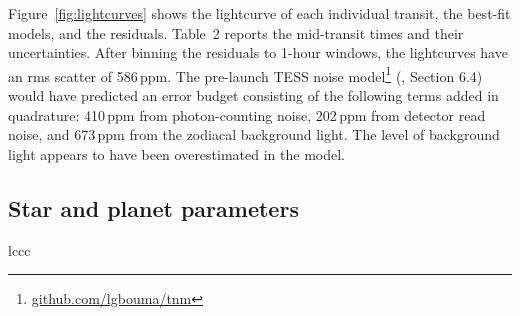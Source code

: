\documentclass[12pt,twocolumn,tighten]{aastex62}
\begin{document}
{Figure~\ref{fig:lightcurves} shows the lightcurve of each individual
transit, the best-fit models, and the residuals.  Table~2 reports the
mid-transit times and their uncertainties.  After binning the
residuals to 1-hour windows, the lightcurves have an rms scatter of
586\,{\rm ppm}.  The pre-launch TESS noise
model\footnote{\url{github.com/lgbouma/tnm}}
(\citealt{winn_photonflux_2013}, \citealt{Sullivan_2015} Section 6.4)
would have predicted an error budget consisting of the following terms
added in quadrature: 410\,{\rm ppm} from photon-counting noise,
202\,{\rm ppm} from detector read noise, and 673\,{\rm ppm} from the
zodiacal background light.  The level of background light appears to
have been overestimated in the model.

\subsection{Star and planet parameters}
\label{sec:system_parameters}

\begin{deluxetable}{lccc}
\tabletypesize{\scriptsize}



\end{deluxetable}}
\end{document}
